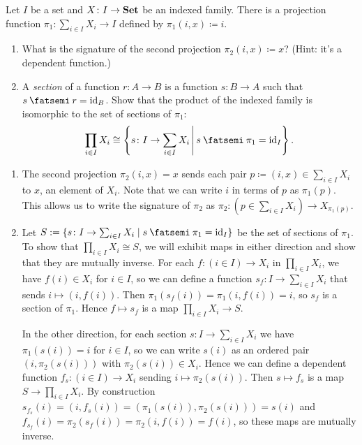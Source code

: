 \documentclass[Book-Poly]{subfiles}
\begin{document}
\begin{exercise}\label{exc.product_as_sections}
    Let $I$ be a set and $X \colon I \to \mathbf{Set}$ be an indexed family.
    There is a
    projection function
    $\pi_1 \colon \sum_{i \in I} X_i \to I$
    defined by $\pi_1(i, x) \coloneqq i$.
    \begin{enumerate}
        \item What is the signature of the second projection $\pi_2(i, x) \coloneqq x$?
        (Hint: it's a dependent function.)
        \item A \emph{section} of a function $r \colon A \to B$ is a function $s \colon B \to A$ such that $s \then r = \id_B$.
        Show that the product of the indexed family is isomorphic to the set of sections of $\pi_1$:
        \[\prod_{i \in I} X_i \cong \left\{s \colon I \to \sum_{i \in I} X_i \,\middle|\, s \then \pi_1 = \id_I\right\}.\]
        \qedhere
    \end{enumerate}
    \begin{solution}
        \begin{enumerate}
            \item The second projection $\pi_2(i, x) = x$ sends each pair $p \coloneqq (i, x) \in \sum_{i \in I} X_i$ to $x$, an element of $X_i$.
            Note that we can write $i$ in terms of $p$ as $\pi_1(p)$.
            This allows us to write the signature of $\pi_2$ as $\pi_2 \colon (p \in \sum_{i \in I} X_i) \to X_{\pi_1(p)}$.

            \item Let $S := \{s \colon I \to \sum_{i \in I} X_i \mid s \then \pi_1 = \id_I\}$ be the set of sections of $\pi_1$. To show that $\prod_{i \in I} X_i \cong S$, we will exhibit maps in either direction and show that they are mutually inverse.
            For each $f \colon (i \in I) \to X_i$ in $\prod_{i \in I} X_i$, we have $f(i) \in X_i$ for $i \in I$, so we can define a function $s_f \colon I \to \sum_{i \in I} X_i$ that sends $i\mapsto(i, f(i))$.
            Then $\pi_1(s_f(i)) = \pi_1(i, f(i)) = i$, so $s_f$ is a section of $\pi_1$.
            Hence $f \mapsto s_f$ is a map $\prod_{i \in I} X_i \to S$.

            In the other direction, for each section $s \colon I \to \sum_{i \in I} X_i$ we have $\pi_1(s(i)) = i$ for $i \in I$, so we can write $s(i)$ as an ordered pair $(i, \pi_2(s(i)))$ with $\pi_2(s(i)) \in X_i$.
            Hence we can define a dependent function $f_s \colon (i \in I) \to X_i$ sending $i\mapsto\pi_2(s(i))$.
            Then $s \mapsto f_s$ is a map $S \to \prod_{i \in I} X_i$.
            By construction $s_{f_s}(i) = (i, f_s(i)) = (\pi_1(s(i)), \pi_2(s(i))) = s(i)$ and $f_{s_f}(i) = \pi_2(s_f(i)) = \pi_2(i, f(i)) = f(i)$, so these maps are mutually inverse.
        \end{enumerate}
    \end{solution}
\end{exercise}
\end{document}
